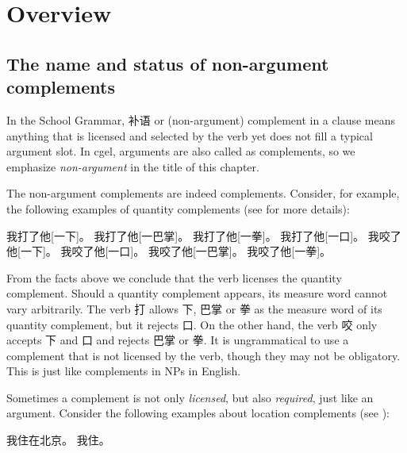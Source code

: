 \documentclass[../main.tex]{subfiles}
\begin{document}

\section{Overview}

\subsection{The name and status of non-argument complements}

In the School Grammar, 补语 or (non-argument) complement in a clause means anything that is licensed and 
selected by the verb yet does not fill a typical argument slot. In \ac{cgel}, arguments are also called 
as complements, so we emphasize \emph{non-argument} in the title of this chapter. 

The non-argument complements are indeed complements. Consider, for example, the following examples
of quantity complements (see  for more details):
\begin{exe}
    \ex \begin{xlist}
        \ex 我打了他[一下]。
        \ex 我打了他[一巴掌]。
        \ex 我打了他[一拳]。
        \ex *我打了他[一口]。
        \ex 我咬了他[一下]。
        \ex 我咬了他[一口]。
        \ex *我咬了他[一巴掌]。
        \ex *我咬了他[一拳]。
    \end{xlist}
\end{exe}
From the facts above we conclude that the verb licenses the quantity complement. Should a quantity
complement appears, its measure word cannot vary arbitrarily. The verb 打 allows 下, 巴掌 or 拳 as 
the measure word of its quantity complement, but it rejects 口. 
On the other hand, the verb 咬 only accepts 下 and 口 and rejects 巴掌 or 拳.
It is ungrammatical to use a complement that is not licensed by the verb, though they may not be 
obligatory. This is just like complements in NPs in English.

Sometimes a complement is not only \emph{licensed}, but also \emph{required}, just like an argument. 
Consider the following examples about location complements (see ):
\begin{exe}
    \ex \begin{xlist}
        \ex 我住在北京。
        \ex *我住。
    \end{xlist}
\end{exe}
\end{document}
